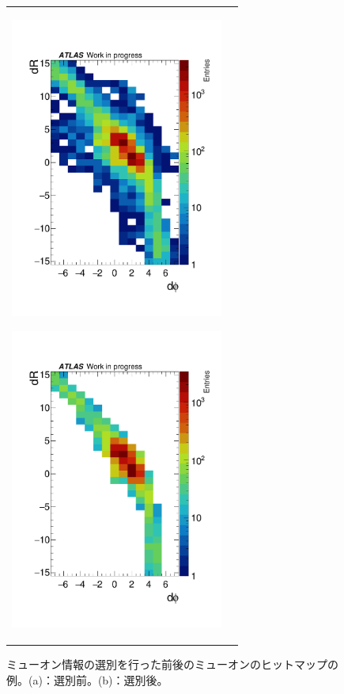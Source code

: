 \begin{figure}[tb]
    \begin{tabular}{cc}
    \centering
    \begin{minipage}[b]{0.45\hsize}%
        \centering
        \hspace*{-1cm}
        \includegraphics[clip, width=7cm]{fig/4/data_phi0_roi33_before_re.pdf}
        \subcaption{}
        \label{4-53be}
    \end{minipage}%
    \begin{minipage}[b]{0.6\hsize}%
        \centering
        \hspace*{-1cm}
        \includegraphics[clip, width=7cm]{fig/4/data_phi0_roi33_after_re.pdf}
        \subcaption{}
        \label{4-53af}
    \end{minipage}%
    \end{tabular}
    \caption{ミューオン情報の選別を行った前後のミューオンのヒットマップの例。(a)：選別前。(b)：選別後。}
    \label{fig:hitmapcleaner}
\end{figure}


